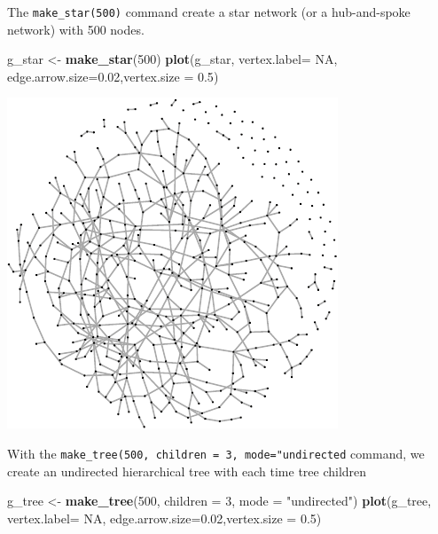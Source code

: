 \documentclass[]{article}
\newenvironment{Shaded}{\begin{snugshade}}{\end{snugshade}}
\newcommand{\KeywordTok}[1]{\textcolor[rgb]{0.13,0.29,0.53}{\textbf{{#1}}}}
\newcommand{\DataTypeTok}[1]{\textcolor[rgb]{0.13,0.29,0.53}{{#1}}}
\newcommand{\DecValTok}[1]{\textcolor[rgb]{0.00,0.00,0.81}{{#1}}}
\newcommand{\FloatTok}[1]{\textcolor[rgb]{0.00,0.00,0.81}{{#1}}}
\newcommand{\StringTok}[1]{\textcolor[rgb]{0.31,0.60,0.02}{{#1}}}
\newcommand{\OtherTok}[1]{\textcolor[rgb]{0.56,0.35,0.01}{{#1}}}
\newcommand{\NormalTok}[1]{{#1}}
\begin{document}
The \texttt{make\_star(500)} command create a star network (or a
hub-and-spoke network) with 500 nodes.

\begin{Shaded}
\begin{Highlighting}[]
\NormalTok{g_star <-}\StringTok{ }\KeywordTok{make_star}\NormalTok{(}\DecValTok{500}\NormalTok{)}
\KeywordTok{plot}\NormalTok{(g_star, }\DataTypeTok{vertex.label=} \OtherTok{NA}\NormalTok{, }\DataTypeTok{edge.arrow.size=}\FloatTok{0.02}\NormalTok{,}\DataTypeTok{vertex.size =} \FloatTok{0.5}\NormalTok{)}
\end{Highlighting}
\end{Shaded}

\includegraphics{ResearchTools_files/figure-latex/unnamed-chunk-48-1.pdf}

With the \texttt{make\_tree(500,\ children\ =\ 3,\ mode="undirected}
command, we create an undirected hierarchical tree with each time tree
children

\begin{Shaded}
\begin{Highlighting}[]
\NormalTok{g_tree <-}\StringTok{ }\KeywordTok{make_tree}\NormalTok{(}\DecValTok{500}\NormalTok{, }\DataTypeTok{children =} \DecValTok{3}\NormalTok{, }\DataTypeTok{mode =} \StringTok{"undirected"}\NormalTok{)}
\KeywordTok{plot}\NormalTok{(g_tree, }\DataTypeTok{vertex.label=} \OtherTok{NA}\NormalTok{, }\DataTypeTok{edge.arrow.size=}\FloatTok{0.02}\NormalTok{,}\DataTypeTok{vertex.size =} \FloatTok{0.5}\NormalTok{)}
\end{Highlighting}
\end{Shaded}
\end{document}
